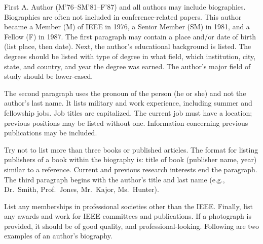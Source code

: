 \documentclass[journal,twoside,web]{ieeecolor2}
\begin{document}
\begin{IEEEbiography}{First A.
Author} (M'76--SM'81--F'87) and all authors may include 
biographies.
Biographies are often not included in conference-related
papers.
This author became a Member (M) of IEEE in 1976, a Senior
Member (SM) in 1981, and a Fellow (F) in 1987.
The first paragraph may
contain a place and/or date of birth (list place, then date).
Next,
the author's educational background is listed.
The degrees should be
listed with type of degree in what field, which institution, city,
state, and country, and year the degree was earned.
The author's major
field of study should be lower-cased.


The second paragraph uses the pronoun of the person (he or she) and not the 
author's last name.
It lists military and work experience, including summer 
and fellowship jobs.
Job titles are capitalized.
The current job must have a 
location; previous positions may be listed 
without one.
Information concerning previous publications may be included.

Try not to list more than three books or published articles.
The format for 
listing publishers of a book within the biography is: title of book 
(publisher name, year) similar to a reference.
Current and previous research 
interests end the paragraph.
The third paragraph begins with the author's 
title and last name (e.g., Dr.\ Smith, Prof.\ Jones, Mr.\ Kajor, Ms.\ Hunter).

List any memberships in professional societies other than the IEEE.
Finally, 
list any awards and work for IEEE committees and publications.
If a 
photograph is provided, it should be of good quality, and 
professional-looking.
Following are two examples of an author's biography.
\end{IEEEbiography}
\end{document}

